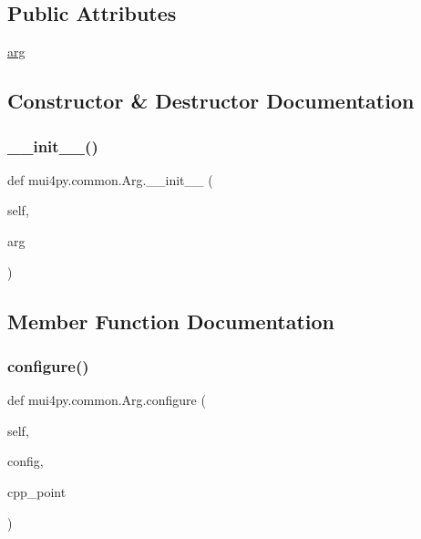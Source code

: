 \subsection*{Public Attributes}
\begin{DoxyCompactItemize}
\item 
\hyperlink{classmui4py_1_1common_1_1_arg_a45ebd7fb8f9080eb469557f4e77e6f0c}{arg}
\end{DoxyCompactItemize}


\subsection{Constructor \& Destructor Documentation}
\mbox{\label{classmui4py_1_1common_1_1_arg_a2eaf791d82b8a8663316ede9133432d5}} 
\subsubsection{\texorpdfstring{\+\_\+\+\_\+init\+\_\+\+\_\+()}{\_\_init\_\_()}}
{\footnotesize\ttfamily def mui4py.\+common.\+Arg.\+\_\+\+\_\+init\+\_\+\+\_\+ (\begin{DoxyParamCaption}\item[{}]{self,  }\item[{}]{arg }\end{DoxyParamCaption})}



\subsection{Member Function Documentation}
\mbox{\label{classmui4py_1_1common_1_1_arg_a045ba65aadaa1d6f9c5dd669dd9fef81}} 
\subsubsection{\texorpdfstring{configure()}{configure()}}
{\footnotesize\ttfamily def mui4py.\+common.\+Arg.\+configure (\begin{DoxyParamCaption}\item[{}]{self,  }\item[{}]{config,  }\item[{}]{cpp\+\_\+point }\end{DoxyParamCaption})}



